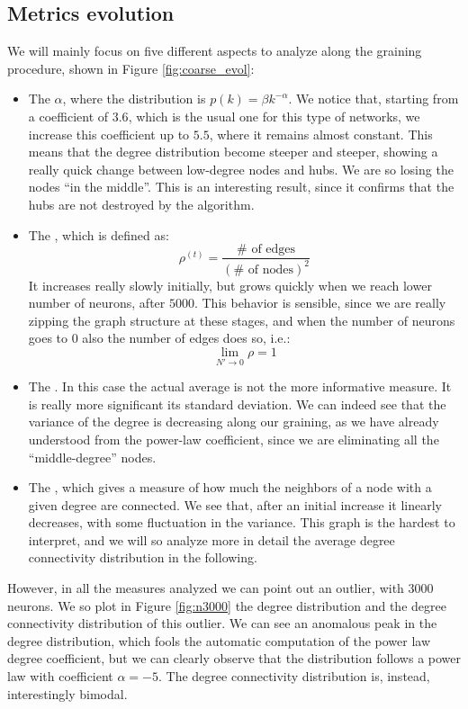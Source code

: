 \subsection{Metrics evolution}
We will mainly focus on five different aspects to analyze along the graining procedure, shown in
Figure \ref{fig:coarse_evol}:
\begin{itemize}
    \item The  $\alpha$, where the 
        distribution is $p(k)=\beta k^{-\alpha}$. We notice that, starting from a coefficient
        of $3.6$, which is the usual one for this type of networks, we increase this coefficient up to 
        $5.5$, where it remains almost constant. This means that the degree distribution become steeper 
        and steeper, showing a really quick change between low-degree nodes and hubs. We are so losing 
        the nodes “in the middle”. This is an interesting result, since it confirms that 
        the hubs are not destroyed by the algorithm.
    \item The , which is defined as:
        \begin{equation}
            \rho^{(t)}=\frac{\# \mbox{ of edges}}{(\# \mbox{ of nodes})^2}
        \end{equation}
        It increases really slowly initially, but grows quickly when we 
        reach lower number of neurons, after $5000$. This behavior is sensible, since we are really
        zipping the graph structure at these stages, and when the number of neurons goes to $0$ also
        the number of edges does so, i.e.:
        $$
        \lim_{N'\rightarrow 0} \rho = 1
        $$
    \item The . In this case the actual average is not the more informative measure. It is really more 
        significant its standard deviation. We can indeed see that the variance of the degree is decreasing 
        along our graining, as we have already understood from the power-law coefficient, since
        we are eliminating all the “middle-degree” nodes. 
    \item The , which gives a measure of how much 
        the neighbors of a node with a given degree are connected. We see that, after an initial 
        increase it linearly decreases, with some fluctuation in the variance. This graph is the hardest to
        interpret, and we will so analyze more in detail the average degree connectivity distribution in the 
        following.
\end{itemize}
However, in all the measures analyzed we can point out an outlier, with $3000$ neurons. 
We so plot in Figure \ref{fig:n3000} the degree distribution and the degree connectivity distribution of this outlier.
We can see an anomalous peak in the degree distribution, which fools the automatic computation of the 
power law degree coefficient, but we can clearly observe that the distribution follows a power law
with coefficient $\alpha=-5$. The degree connectivity distribution is, instead, interestingly bimodal.

